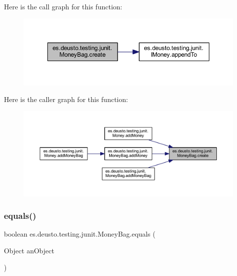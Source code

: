Here is the call graph for this function\+:
\nopagebreak
\begin{figure}[H]
\begin{center}
\leavevmode
\includegraphics[width=348pt]{classes_1_1deusto_1_1testing_1_1junit_1_1_money_bag_a8d2d54a342d2de2b75530600123efc9a_cgraph}
\end{center}
\end{figure}
Here is the caller graph for this function\+:
\nopagebreak
\begin{figure}[H]
\begin{center}
\leavevmode
\includegraphics[width=350pt]{classes_1_1deusto_1_1testing_1_1junit_1_1_money_bag_a8d2d54a342d2de2b75530600123efc9a_icgraph}
\end{center}
\end{figure}
\mbox{\label{classes_1_1deusto_1_1testing_1_1junit_1_1_money_bag_a80926d10c9619bd2ad84eabe52ca03bb}} 
\subsubsection{\texorpdfstring{equals()}{equals()}}
{\footnotesize\ttfamily boolean es.\+deusto.\+testing.\+junit.\+Money\+Bag.\+equals (\begin{DoxyParamCaption}\item[{Object}]{an\+Object }\end{DoxyParamCaption})}



